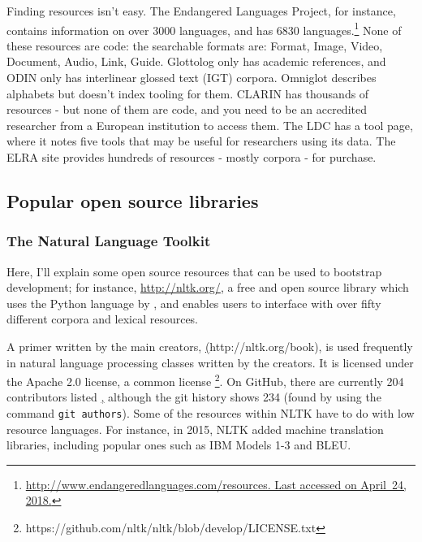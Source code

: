 Finding resources isn't easy. The Endangered Languages Project, for instance, contains information on over 3000 languages, and has 6830 languages.\footnote{\href{http://www.endangeredlanguages.com/resources/}{http://www.endangeredlanguages.com/resources. Last accessed on April~24, 2018.}} None of these resources are code: the searchable formats are: Format, Image, Video, Document, Audio, Link, Guide. Glottolog only has academic references, and ODIN only has interlinear glossed text (IGT) corpora. Omniglot describes alphabets but doesn't index tooling for them. CLARIN has thousands of resources - but none of them are code, and you need to be an accredited researcher from a European institution to access them. The LDC has a tool page, where it notes five tools that may be useful for researchers using its data. The ELRA site provides hundreds of resources - mostly corpora - for purchase.



\subsection{Popular open source libraries}
\label{subsec:popular-open-source-libraries}

\subsubsection{The Natural Language Toolkit}
Here, I'll explain some open source resources that can be used to bootstrap development; for instance, \href{NLTK (Natural Language Toolkit)}{http://nltk.org/}, a free and open source library which uses the Python language by \citet{bird2006nltk}, and enables users to interface with over fifty different corpora and lexical resources.

A primer written by the main creators, \href{Natural Language Processing with Python}(http://nltk.org/book), is used frequently in natural language processing classes written by the creators. It is licensed under the Apache 2.0 license, a common license \footnote{https://github.com/nltk/nltk/blob/develop/LICENSE.txt}. On GitHub, there are currently 204 contributors listed \href{https://github.com/nltk/nltk/graphs/contributors}, although the git history shows 234 (found by using the command {\tt git authors}).%
Some of the resources within NLTK have to do with low resource languages. For instance, in 2015, NLTK added machine translation libraries, including popular ones such as IBM Models 1-3 and BLEU.

